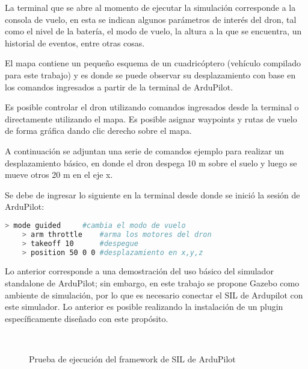 La terminal que se abre al momento de ejecutar la simulación corresponde a la consola de vuelo, en esta se indican algunos parámetros de interés del dron, tal como el nivel de la batería, el modo de vuelo, la altura a la que se encuentra, un historial de eventos, entre otras cosas.

El mapa contiene un pequeño esquema de un cuadricóptero (vehículo compilado para este trabajo) y es donde se puede observar su desplazamiento con base en los comandos ingresados a partir de la terminal de ArduPilot.

Es posible controlar el dron utilizando comandos ingresados desde la terminal o directamente utilizando el mapa. Es posible asignar waypoints y rutas de vuelo de forma gráfica dando clic derecho sobre el mapa.

A continuación se adjuntan una serie de comandos ejemplo para realizar un desplazamiento básico, en donde el dron despega 10 m sobre el suelo y luego se mueve otros 20 m en el eje x.

Se debe de ingresar lo siguiente en la terminal desde donde se inició la sesión de ArduPilot:

\begin{lstlisting}[language = bash]
    > mode guided     #cambia el modo de vuelo
    > arm throttle    #arma los motores del dron
    > takeoff 10      #despegue
    > position 50 0 0 #desplazamiento en x,y,z
\end{lstlisting}  

Lo anterior corresponde a una demostración del uso básico del simulador standalone de ArduPilot; sin embargo, en este trabajo se propone Gazebo como ambiente de simulación, por lo que es necesario conectar el SIL de Ardupilot con este simulador. Lo anterior es posible realizando la instalación de un plugin específicamente diseñado con este propósito.


\begin{figure}[ht]
    \centering
    \hfill
    \\
    \hfill
    \caption{Prueba de ejecución del framework de SIL de ArduPilot}
    \label{fig:Ardupilot}
\end{figure}

